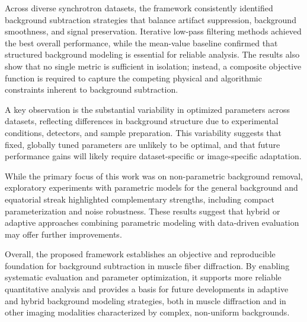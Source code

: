 \documentclass[iucr]{iucrjournals}
\begin{document}
Across diverse synchrotron datasets, the framework consistently identified background subtraction strategies that balance artifact suppression, background smoothness, and signal preservation. Iterative low-pass filtering methods achieved the best overall performance, while the mean-value baseline confirmed that structured background modeling is essential for reliable analysis. The results also show that no single metric is sufficient in isolation; instead, a composite objective function is required to capture the competing physical and algorithmic constraints inherent to background subtraction.

A key observation is the substantial variability in optimized parameters across datasets, reflecting differences in background structure due to experimental conditions, detectors, and sample preparation. This variability suggests that fixed, globally tuned parameters are unlikely to be optimal, and that future performance gains will likely require dataset-specific or image-specific adaptation.

While the primary focus of this work was on non-parametric background removal, exploratory experiments with parametric models for the general background and equatorial streak highlighted complementary strengths, including compact parameterization and noise robustness. These results suggest that hybrid or adaptive approaches combining parametric modeling with data-driven evaluation may offer further improvements.

Overall, the proposed framework establishes an objective and reproducible foundation for background subtraction in muscle fiber diffraction. By enabling systematic evaluation and parameter optimization, it supports more reliable quantitative analysis and provides a basis for future developments in adaptive and hybrid background modeling strategies, both in muscle diffraction and in other imaging modalities characterized by complex, non-uniform backgrounds.







\end{document}
